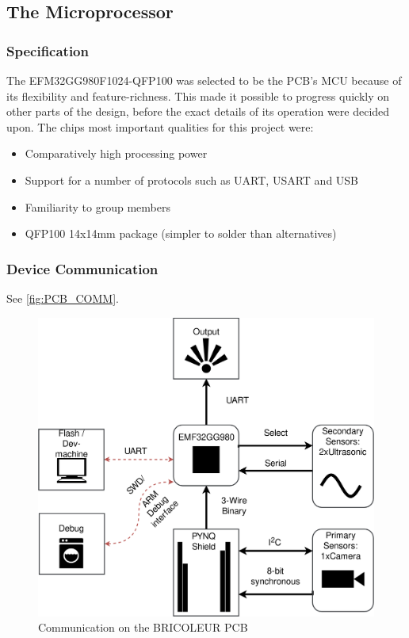 \subsection{The Microprocessor}
\subsubsection{Specification} %
The EFM32GG980F1024-QFP100 was selected to be the PCB's MCU because of its flexibility and feature-richness. This made it possible to progress quickly on other parts of the design, before the exact details of its operation were decided upon. The chips most important qualities for this project were:
\begin{itemize}
    \item Comparatively high processing power
    \item Support for a number of protocols such as UART, USART and USB 
    \item Familiarity to group members
    \item QFP100 14x14mm package (simpler to solder than alternatives) %
\end{itemize}

\subsubsection{Device Communication}
See \autoref{fig:PCB_COMM}.
\begin{figure}
    \centering
    \includegraphics[scale=0.2]{Images/PCB(7).png}
    \caption{Communication on the BRICOLEUR PCB}
    \label{fig:PCB_COMM}
\end{figure}

